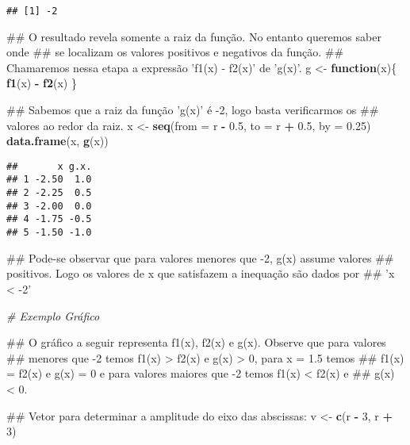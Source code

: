 \documentclass[]{book}
\newenvironment{Shaded}{\begin{snugshade}}{\end{snugshade}}
\newcommand{\KeywordTok}[1]{\textcolor[rgb]{0.13,0.29,0.53}{\textbf{#1}}}
\newcommand{\DataTypeTok}[1]{\textcolor[rgb]{0.13,0.29,0.53}{#1}}
\newcommand{\DecValTok}[1]{\textcolor[rgb]{0.00,0.00,0.81}{#1}}
\newcommand{\FloatTok}[1]{\textcolor[rgb]{0.00,0.00,0.81}{#1}}
\newcommand{\StringTok}[1]{\textcolor[rgb]{0.31,0.60,0.02}{#1}}
\newcommand{\CommentTok}[1]{\textcolor[rgb]{0.56,0.35,0.01}{\textit{#1}}}
\newcommand{\ControlFlowTok}[1]{\textcolor[rgb]{0.13,0.29,0.53}{\textbf{#1}}}
\newcommand{\OperatorTok}[1]{\textcolor[rgb]{0.81,0.36,0.00}{\textbf{#1}}}
\newcommand{\NormalTok}[1]{#1}
\begin{document}
\begin{enumerate}
\begin{verbatim}
## [1] -2
\end{verbatim}

\begin{Shaded}
\begin{Highlighting}[]
\NormalTok{##  O resultado revela somente a raiz da função. No entanto queremos saber onde}
\NormalTok{## se localizam os valores positivos e negativos da função.}
\NormalTok{##  Chamaremos nessa etapa a expressão 'f1(x) - f2(x)' de 'g(x)'.}
\NormalTok{g <-}\StringTok{ }\ControlFlowTok{function}\NormalTok{(x)\{}
  \KeywordTok{f1}\NormalTok{(x) }\OperatorTok{-}\StringTok{ }\KeywordTok{f2}\NormalTok{(x)}
\NormalTok{\}}

\NormalTok{##  Sabemos que a raiz da função 'g(x)' é -2, logo basta verificarmos os}
\NormalTok{## valores ao redor da raiz.}
\NormalTok{x <-}\StringTok{ }\KeywordTok{seq}\NormalTok{(}\DataTypeTok{from =}\NormalTok{ r }\OperatorTok{-}\StringTok{ }\FloatTok{0.5}\NormalTok{, }\DataTypeTok{to =}\NormalTok{ r }\OperatorTok{+}\StringTok{ }\FloatTok{0.5}\NormalTok{, }\DataTypeTok{by =} \FloatTok{0.25}\NormalTok{)}
\KeywordTok{data.frame}\NormalTok{(x, }\KeywordTok{g}\NormalTok{(x))}
\end{Highlighting}
\end{Shaded}

\begin{verbatim}
##       x g.x.
## 1 -2.50  1.0
## 2 -2.25  0.5
## 3 -2.00  0.0
## 4 -1.75 -0.5
## 5 -1.50 -1.0
\end{verbatim}

\begin{Shaded}
\begin{Highlighting}[]
\NormalTok{##  Pode-se observar que para valores menores que -2, g(x) assume valores}
\NormalTok{## positivos. Logo os valores de x que satisfazem a inequação são dados por}
\NormalTok{## 'x < -2'}

\CommentTok{# Exemplo Gráfico}

\NormalTok{##  O gráfico a seguir representa f1(x), f2(x) e g(x). Observe que para valores}
\NormalTok{## menores que -2 temos f1(x) > f2(x) e g(x) > 0, para x = 1.5 temos }
\NormalTok{## f1(x) = f2(x) e g(x) = 0 e para valores maiores que -2 temos f1(x) < f2(x) e}
\NormalTok{## g(x) < 0.}

\NormalTok{##  Vetor para determinar a amplitude do eixo das abscissas:}
\NormalTok{v <-}\StringTok{ }\KeywordTok{c}\NormalTok{(r }\OperatorTok{-}\StringTok{ }\DecValTok{3}\NormalTok{, r }\OperatorTok{+}\StringTok{ }\DecValTok{3}\NormalTok{)}


\end{Highlighting}
\end{Shaded}
\end{enumerate}
\end{document}
